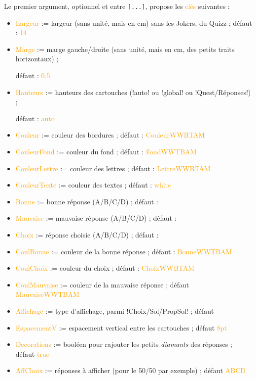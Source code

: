 \documentclass[french,a4paper,11pt]{article}
\newcommand\Cle[1]{{\small\sffamily\textlangle \textcolor{orange}{#1}\textrangle}}
\begin{document}
\begin{tipblock}
Le premier argument, optionnel et entre \texttt{[...]}, propose les \Cle{clés} suivantes :

\begin{itemize}
	\item \Cle{Largeur} := largeur (sans unité, mais en cm) sans les Jokers, du Quizz ; \hfill{}défaut : \Cle{14}
	\item \Cle{Marge} := marge gauche/droite (sans unité, mais en cm, des petits traits horizontaux) ;
	
	\hfill{}défaut : \Cle{0.5}
	\item \Cle{Hauteurs} := hauteurs des cartouches (\motcletex!auto! ou \motcletex!global! ou \motcletex!Quest/Réponses!) ;
	
	\hfill{}défaut : \Cle{auto}
	\item \Cle{Couleur} := couleur des bordures ; \hfill{}défaut : \Cle{CouleurWWBTAM}
	\item \Cle{CouleurFond} := couleur du fond ; \hfill{}défaut : \Cle{FondWWTBAM}
	\item \Cle{CouleurLettre} := couleur des lettres ; \hfill{}défaut : \Cle{LettreWWBTAM}
	\item \Cle{CouleurTexte} := couleur des textes ; \hfill{}défaut : \Cle{white}
	\item \Cle{Bonne} := bonne réponse (A/B/C/D) ; \hfill{}défaut : \Cle{}
	\item \Cle{Mauvaise} := mauvaise réponse (A/B/C/D) ; \hfill{}défaut : \Cle{}
	\item \Cle{Choix} := réponse choisie (A/B/C/D) ; \hfill{}défaut : \Cle{}
	\item \Cle{CoulBonne} := couleur de la bonne réponse ; \hfill{}défaut : \Cle{BonneWWTBAM}
	\item \Cle{CoulChoix} := couleur du choix ; \hfill{}défaut : \Cle{ChoixWWBTAM}
	\item \Cle{CoulMauvaise} := couleur de la mauvaise réponse ; \hfill{}défaut \Cle{MauvaiseWWTBAM}
	\item \Cle{Affichage} := type d'affichage, parmi \motcletex!Choix/Sol/PropSol! ; \hfill{}défaut \Cle{}
	\item \Cle{EspacementV} := espacement vertical entre les cartouches ; \hfill{}défaut \Cle{8pt}
	\item \Cle{Decorations} := booléen pour rajouter les petits \textit{diamants} des réponses  ; \hfill{}défaut \Cle{true}
	\item \Cle{AffChoix} := réponses à afficher (pour le 50/50 par exemple)  ; \hfill{}défaut \Cle{ABCD}

\end{itemize}
\end{tipblock}
\end{document}
